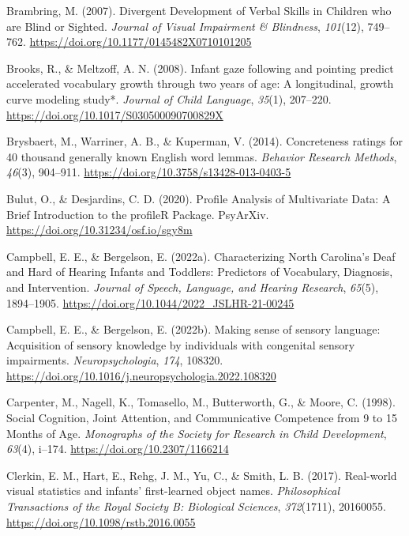 \documentclass[
  man,floatsintext]{apa6}
\newlength{\cslhangindent}
\newlength{\cslentryspacingunit} %
\newenvironment{CSLReferences}[2] %
 {%
  \setlength{\parindent}{0pt}
  \ifodd #1
  \let\oldpar\par
  \def\par{\hangindent=\cslhangindent\oldpar}
  \fi
  \setlength{\parskip}{#2\cslentryspacingunit}
 }%
 {}
\begin{document}
\begin{CSLReferences}{1}{0}
\leavevmode{}%
Brambring, M. (2007). Divergent {Development} of {Verbal Skills} in {Children} who are {Blind} or {Sighted}. \emph{Journal of Visual Impairment \& Blindness}, \emph{101}(12), 749--762. \url{https://doi.org/10.1177/0145482X0710101205}

\leavevmode{}%
Brooks, R., \& Meltzoff, A. N. (2008). Infant gaze following and pointing predict accelerated vocabulary growth through two years of age: A longitudinal, growth curve modeling study*. \emph{Journal of Child Language}, \emph{35}(1), 207--220. \url{https://doi.org/10.1017/S030500090700829X}

\leavevmode{}%
Brysbaert, M., Warriner, A. B., \& Kuperman, V. (2014). Concreteness ratings for 40 thousand generally known {English} word lemmas. \emph{Behavior Research Methods}, \emph{46}(3), 904--911. \url{https://doi.org/10.3758/s13428-013-0403-5}

\leavevmode{}%
Bulut, O., \& Desjardins, C. D. (2020). Profile {Analysis} of {Multivariate Data}: {A Brief Introduction} to the {profileR Package}. {PsyArXiv}. \url{https://doi.org/10.31234/osf.io/sgy8m}

\leavevmode{}%
Campbell, E. E., \& Bergelson, E. (2022a). Characterizing {North Carolina}'s {Deaf} and {Hard} of {Hearing Infants} and {Toddlers}: {Predictors} of {Vocabulary}, {Diagnosis}, and {Intervention}. \emph{Journal of Speech, Language, and Hearing Research}, \emph{65}(5), 1894--1905. \url{https://doi.org/10.1044/2022_JSLHR-21-00245}

\leavevmode{}%
Campbell, E. E., \& Bergelson, E. (2022b). Making sense of sensory language: {Acquisition} of sensory knowledge by individuals with congenital sensory impairments. \emph{Neuropsychologia}, \emph{174}, 108320. \url{https://doi.org/10.1016/j.neuropsychologia.2022.108320}

\leavevmode{}%
Carpenter, M., Nagell, K., Tomasello, M., Butterworth, G., \& Moore, C. (1998). Social {Cognition}, {Joint Attention}, and {Communicative Competence} from 9 to 15 {Months} of {Age}. \emph{Monographs of the Society for Research in Child Development}, \emph{63}(4), i--174. \url{https://doi.org/10.2307/1166214}

\leavevmode{}%
Clerkin, E. M., Hart, E., Rehg, J. M., Yu, C., \& Smith, L. B. (2017). Real-world visual statistics and infants' first-learned object names. \emph{Philosophical Transactions of the Royal Society B: Biological Sciences}, \emph{372}(1711), 20160055. \url{https://doi.org/10.1098/rstb.2016.0055}


\end{CSLReferences}
\end{document}
